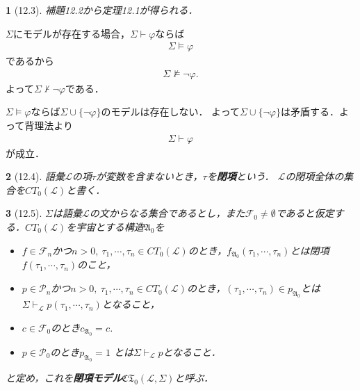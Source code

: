 \documentclass[a4j,10.5pt,oneside,openany]{jsbook}
\theoremstyle{mystyle}
\newtheorem{thm}{\color{DarkMidnightBlue}{定理}}[section]
\newtheorem{dfn}[thm]{\color{PakistanGreen}{定義}}
\begin{document}
	\begin{screen}
		\begin{thm}[12.3]
			補題12.2から定理12.1が得られる．
		\end{thm}
	\end{screen}
	
	$\Sigma$にモデルが存在する場合，$\Sigma \vdash \varphi$ならば
	\begin{align}
		\Sigma \models \varphi
	\end{align}
	であるから
	\begin{align}
		\Sigma \not\models \neg \varphi.
	\end{align}
	よって$\Sigma \not\vdash \neg \varphi$である．
	
	$\Sigma \models \varphi$ならば$\Sigma \cup \{\neg \varphi\}$のモデルは存在しない．
	よって$\Sigma \cup \{\neg \varphi\}$は矛盾する．よって背理法より
	\begin{align}
		\Sigma \vdash \varphi
	\end{align}
	が成立．
	
	\begin{screen}
		\begin{dfn}[12.4]
			語彙$\mathcal{L}$の項$\tau$が変数を含まないとき，$\tau$を{\bf 閉項}という．
			$\mathcal{L}$の閉項全体の集合を$CT_{0}(\mathcal{L})$と書く．
		\end{dfn}
	\end{screen}
	
	\begin{screen}
		\begin{dfn}[12.5]
			$\Sigma$は語彙$\mathcal{L}$の文からなる集合であるとし，また$\mathcal{F}_{0} \neq
			\emptyset$であると仮定する．$CT_{0}(\mathcal{L})$を宇宙とする構造$\mathfrak{A}_{0}$を
			\begin{itemize}
				\item $f \in \mathcal{F}_{n}$かつ$n > 0,\ \tau_{1},\cdots,\tau_{n}
					\in CT_{0}(\mathcal{L})$のとき，$f_{\mathfrak{A}_{0}}(\tau_{1},
					\cdots,\tau_{n})$とは閉項$f(\tau_{1},\cdots,\tau_{n})$のこと，
					
				\item $p \in \mathcal{P}_{n}$かつ$n > 0,\ \tau_{1},\cdots,\tau_{n}
					\in CT_{0}(\mathcal{L})$のとき，$(\tau_{1},\cdots,\tau_{n}) \in 
					p_{\mathfrak{A}_{0}}$とは$\Sigma \vdash_{\mathcal{L}}
					p(\tau_{1},\cdots,\tau_{n})$となること，
				
				\item $c \in \mathcal{F}_{0}$のとき$c_{\mathfrak{A}_{0}} = c$.
				\item $p \in \mathcal{P}_{0}$のとき$p_{\mathfrak{A}_{0}} = 1$
					とは$\Sigma \vdash_{\mathcal{L}} p$となること．
			\end{itemize}
			と定め，これを{\bf 閉項モデル$\mathfrak{CT}_{0}(\mathcal{L},\Sigma)$}と呼ぶ．
		\end{dfn}
	\end{screen}
	
\end{document}
